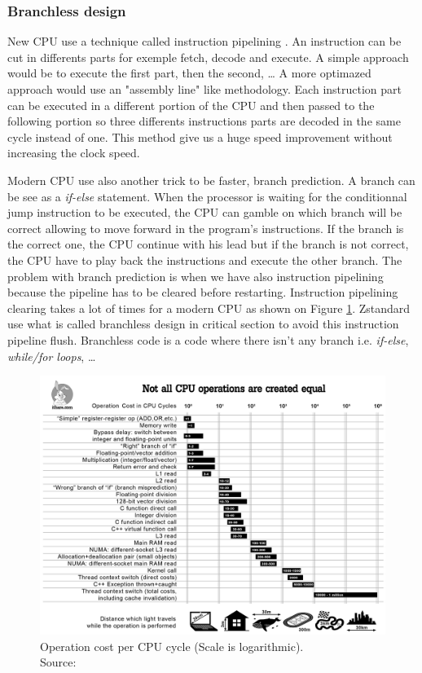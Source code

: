 \documentclass{sig-alternate-05-2015}
\begin{document}
    \subsubsection{Branchless design}
        New CPU use a technique called instruction pipelining \cite{pipelining}. An instruction can be
        cut in differents parts for exemple fetch, decode and execute. A simple approach would be to
        execute the first part, then the second, \ldots{} A more optimazed approach would use an
        "assembly line" like methodology. Each instruction part can be executed in a different
        portion of the CPU and then passed to the following portion so three differents instructions
        parts are decoded in the same cycle instead of one. This method give us a huge speed
        improvement without increasing the clock speed.

        Modern CPU use also another trick to be faster, branch prediction. A branch can be see as a
        \textit{if-else} statement. When the processor is waiting for the conditionnal jump
        instruction to be executed, the CPU can gamble on which branch will be correct allowing
        to move forward in the program's instructions. If the branch is the correct one, the CPU
        continue with his lead but if the branch is not correct, the CPU have to play back the
        instructions and execute the other branch. The problem with branch prediction is when we
        have also instruction pipelining because the pipeline has to be cleared before restarting.
        Instruction pipelining clearing takes a lot of times for a modern CPU as shown on Figure
        \ref{fig:costop}. Zstandard use what is called branchless design in critical section to
        avoid this instruction pipeline flush. Branchless code is a code where there isn't any
        branch i.e. \textit{if-else}, \textit{while/for loops}, \ldots

        \begin{figure}
            \centerline{\includegraphics[scale=0.11]{costCPUop.png}}
            \caption{Operation cost per CPU cycle (Scale is logarithmic). \\ Source: \cite{costop}}
            \label{fig:costop}
        \end{figure}
\end{document}
